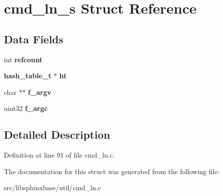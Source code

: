 \section{cmd\-\_\-ln\-\_\-s Struct Reference}
\label{structcmd__ln__s}
\subsection*{Data Fields}
\begin{DoxyCompactItemize}
\item 
int {\bfseries refcount}\label{structcmd__ln__s_a63fe07841bd076831696553d41fa5d2e}

\item 
{\bf hash\-\_\-table\-\_\-t} $\ast$ {\bfseries ht}\label{structcmd__ln__s_a108567dbe131b18b5c795a7cec122748}

\item 
char $\ast$$\ast$ {\bfseries f\-\_\-argv}\label{structcmd__ln__s_a1c4c926ebe10d7fd9664573f4b173aa8}

\item 
uint32 {\bfseries f\-\_\-argc}\label{structcmd__ln__s_a51088e3e7e8477f185ebc07aeb20d63f}

\end{DoxyCompactItemize}


\subsection{Detailed Description}


Definition at line 91 of file cmd\-\_\-ln.\-c.



The documentation for this struct was generated from the following file\-:\begin{DoxyCompactItemize}
\item 
src/libsphinxbase/util/cmd\-\_\-ln.\-c\end{DoxyCompactItemize}
